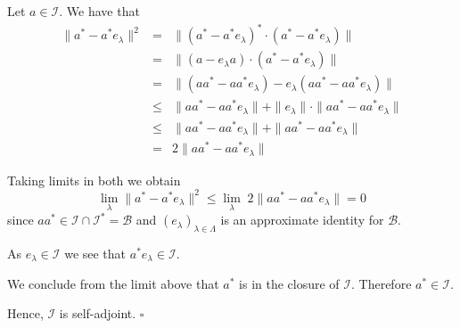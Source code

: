 \documentclass[12pt]{article}
\begin{document}
Let $a \in \mathcal{I}$. We have that
\begin{eqnarray*}
\|a^*-a^*e_{\lambda}\|^2 & = & \|(a^*-a^*e_{\lambda})^*\cdot(a^*-a^*e_{\lambda})\| \\
& = & \|(a- e_{\lambda}a)\cdot(a^*- a^*e_{\lambda})\| \\
& = & \|(aa^*-aa^*e_{\lambda}) -e_{\lambda}(aa^*-aa^*e_{\lambda})\| \\
& \leq & \|aa^*-aa^*e_{\lambda}\| + \|e_{\lambda}\|\cdot \|aa^*-aa^*e_{\lambda}\| \\
& \leq & \|aa^*-aa^*e_{\lambda}\| + \|aa^*-aa^*e_{\lambda}\| \\
& = & 2 \|aa^*-aa^*e_{\lambda}\|
\end{eqnarray*}

Taking limits in both  we obtain
\begin{displaymath}
\lim_{\lambda}\|a^*-a^*e_{\lambda}\|^2 \leq \lim_{\lambda}\;2 \|aa^*-aa^*e_{\lambda}\| = 0
\end{displaymath}
since $aa^* \in \mathcal{I}\cap\mathcal{I}^*=\mathcal{B}$ and $(e_{\lambda})_{\lambda \in\Lambda}$ is an approximate identity for $\mathcal{B}$.

As $e_{\lambda} \in \mathcal{I}$ we see that $a^*e_{\lambda} \in \mathcal{I}$.

We conclude from the limit above that $a^*$ is in the closure of $\mathcal{I}$. Therefore $a^*\in \mathcal{I}$.

Hence, $\mathcal{I}$ is self-adjoint. $\square$
\end{document}
